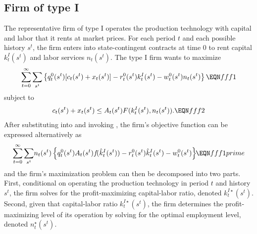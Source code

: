 \subsection{Firm of type I}
The representative firm of type I operates the production technology
with capital and labor that it rents at market prices. For each period
$t$ and each possible history $s^t$, the firm enters into
state-contingent contracts at time $0$ to rent capital $k^{I}_t(s^t)$
and labor services $n_t(s^t)$. The type I firm
wants to maximize
$$ \sumst \left\{\qst [\cst +\xst]   -\rst k^I_t(s^t)
   -\wst \nst \right\} \EQN fff1 $$
subject to
$$ \cst +\xst \leq \Ast F(k^I_t(s^t), \nst). \EQN fff2 $$
After substituting  into  and invoking
, the firm's objective function can be
expressed alternatively as
$$ \sumst \nst\left\{\qst \Ast f\!(\hat k^I_t(s^t))
    -\rst \hat k^I_t(s^t)  -\wst \right\} \hskip-.1cm\EQN fff1prime $$
and the firm's maximization problem can then be decomposed into two parts.
First, conditional on operating the production technology
in period $t$ and history $s^t$, the firm solves for the
profit-maximizing capital-labor ratio, denoted $k^{I\star}_t(s^t)$.
Second, given that capital-labor ratio $k^{I\star}_t(s^t)$,
the firm determines the profit-maximizing level of its operation
by solving for the optimal employment level, denoted
$n^\star_t(s^t)$.


